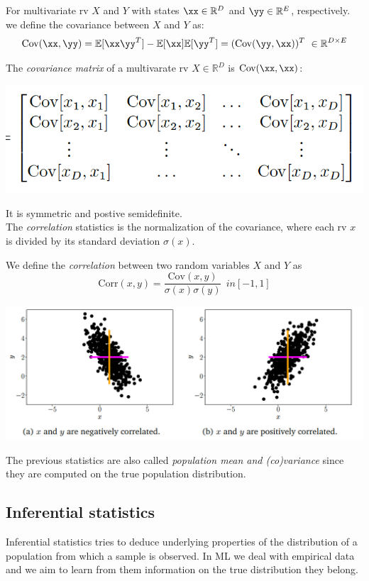  For multivariate rv $X$ and $Y$ with states $\xx \in \mathbb{R}^D$ and $\yy \in \mathbb{R}^E$, respectively. we define the covariance between $X$ and $Y$ as:
 $$\text{Cov}(\xx, \yy) = \mathbb{E}[\xx\yy^T]-\mathbb{E}[\xx]\mathbb{E}[\yy^T]=(\text{Cov}(\yy, \xx))^T \ \in \mathbb{R}^{D \times E}$$
 
 The \textit{covariance matrix} of a multivarate rv $X \in \mathbb{R}^D$ is $\text{Cov}(\xx, \xx)$:
 
 \includegraphics[width=0.6 \textwidth]{sections/images/prob1.png}
 
 It is symmetric and postive semidefinite. \\
 The \textit{correlation} statistics is the normalization of the covariance, where each rv $x$ is divided by its standard deviation $\sigma(x)$.

 \begin{definition}
     We define the \textit{correlation} between two random variables $X$ and $Y$ as
     $$ \text{Corr}(x, y) = \frac{\text{Cov}(x, y)}{\sigma(x)\sigma(y)}  \ \ in [-1,1]$$
 \end{definition}

\includegraphics[width=0.6 \textwidth]{sections/images/prob2.png}




The previous statistics are also called \textit{population mean and (co)variance} since they are computed on the true population distribution.

 \subsection{Inferential statistics}
 Inferential statistics tries to deduce underlying properties of the distribution of a population from which a sample is observed.  In ML we deal with empirical data and we aim to learn from them information on the true distribution they belong. 
 
